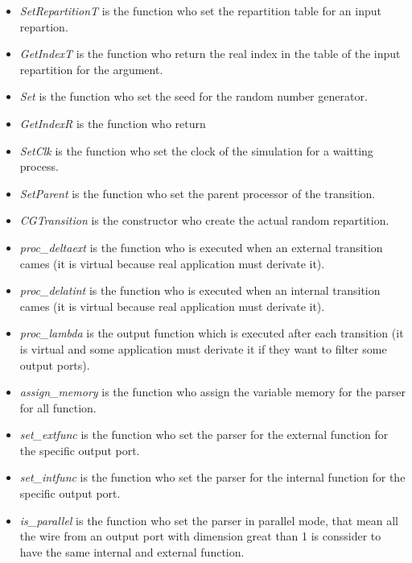 \documentclass[a4paper,oneside,notitlepage]{article}
\begin{document}
\begin{itemize}
\item \textit{SetRepartitionT} is the function who set the repartition table
for an input repartion.

\item \textit{GetIndexT} is the function who return the real index in the
table of the input repartition for the argument.

\item \textit{Set} is the function who set the seed for the random number
generator.

\item \textit{GetIndexR} is the function who return

\item \textit{SetClk} is the function who set the clock of the simulation
for a waitting process.

\item \textit{SetParent} is the function who set the parent processor of the
transition.

\item \textit{CGTransition} is the constructor who create the actual random
repartition.

\item \textit{proc\_deltaext} is the function who is executed when an
external transition cames (it is virtual because real application must
derivate it).

\item \textit{proc\_delatint} is the function who is executed when an
internal transition cames (it is virtual because real application must
derivate it).

\item \textit{proc\_lambda} is the output function which is executed after
each transition (it is virtual and some application must derivate it if they
want to filter some output ports).

\item \textit{assign\_memory} is the function who assign the variable memory
for the parser for all function.

\item \textit{set\_extfunc} is the function who set the parser for the
external function for the specific output port.

\item \textit{set\_intfunc} is the function who set the parser for the
internal function for the specific output port.

\item \textit{is\_parallel} is the function who set the parser in parallel
mode, that mean all the wire from an output port with dimension great than 1
is conssider to have the same internal and external function.
\end{itemize}
\end{document}
